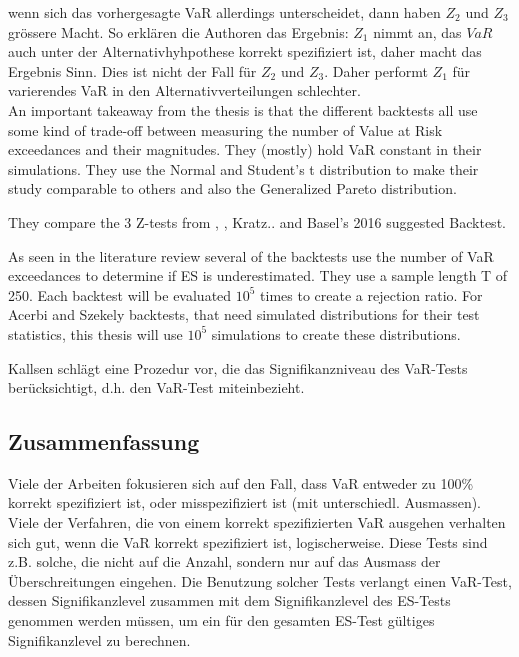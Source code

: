 \documentclass[12pt,a4paper]{article}
\begin{document}
	wenn sich das vorhergesagte VaR allerdings unterscheidet, dann haben $Z_2$ und $Z_3$ grössere Macht.
	So erklären die Authoren das Ergebnis:
	$Z_1$ nimmt an, das $VaR$ auch unter der Alternativhyhpothese korrekt spezifiziert ist, daher macht das Ergebnis Sinn.
	Dies ist nicht der Fall für $Z_2$ und $Z_3$.
	Daher performt $Z_1$ für varierendes VaR in den Alternativverteilungen schlechter.
	\\
	\cite{edberg_non-parametricbacktesting_2017} 
	An important takeaway from the thesis is that the different backtests all use some kind of trade-off between measuring the number of Value at Risk exceedances and their magnitudes.
	They (mostly) hold VaR constant in their simulations.
	They use the Normal and Student's t distribution to make their study comparable to others and also the Generalized Pareto distribution.
	
	They compare the 3 Z-tests from \cite{acerbi_back-testing_2014}, \cite{costanzino_backtesting_2015}, Kratz..
	and Basel's 2016 suggested Backtest.
	
	As seen in the literature review several of the backtests use the number of VaR exceedances to determine if ES is underestimated.
	They use a sample length T of 250. Each backtest will be evaluated $10^5$ times to create a rejection ratio.
	For Acerbi and Szekely backtests, that need simulated distributions for their test statistics, this thesis will use $10^5$ simulations to create these distributions.
	
	Kallsen schlägt eine Prozedur vor, die das Signifikanzniveau des VaR-Tests berücksichtigt, d.h. den VaR-Test miteinbezieht.
	
	\subsection{Zusammenfassung}
	Viele der Arbeiten fokusieren sich auf den Fall, dass VaR entweder zu 100\% korrekt spezifiziert ist, oder misspezifiziert ist (mit unterschiedl. Ausmassen).
	Viele der Verfahren, die von einem korrekt spezifizierten VaR ausgehen verhalten sich gut, wenn die VaR korrekt spezifiziert ist, logischerweise.
	Diese Tests sind z.B. solche, die nicht auf die Anzahl, sondern nur auf das Ausmass der Überschreitungen eingehen.
	Die Benutzung solcher Tests verlangt einen VaR-Test, dessen Signifikanzlevel zusammen mit dem Signifikanzlevel des ES-Tests genommen werden müssen, um ein für den gesamten ES-Test gültiges Signifikanzlevel zu berechnen.\\
	
\end{document}
